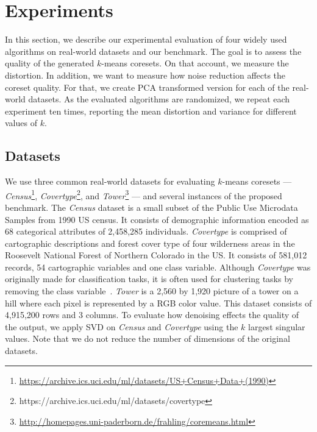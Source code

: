 \section{Experiments} \label{sec:experiments}
In this section, we describe our experimental evaluation of four widely used algorithms on real-world datasets and our benchmark. The goal is to assess the quality of the generated $k$-means coresets. On that account, we measure the distortion. In addition, we want to measure how noise reduction affects the coreset quality. For that, we create PCA transformed version for each of the real-world datasets. As the evaluated algorithms are randomized, we repeat each experiment ten times, reporting the mean distortion and variance for different values of $k$.


\subsection{Datasets}
We use three common real-world datasets for evaluating $k$-means coresets 
---
\textit{Census}\footnote{\url{https://archive.ics.uci.edu/ml/datasets/US+Census+Data+(1990)}},
\textit{Covertype}\footnote{https://archive.ics.uci.edu/ml/datasets/covertype}, and 
\textit{Tower}\footnote{\url{http://homepages.uni-paderborn.de/frahling/coremeans.html}}
---
and several instances of the proposed benchmark. 
The \textit{Census} dataset is a small subset of the Public Use Microdata Samples from 1990 US census. It consists of demographic information encoded as 68 categorical attributes of 2,458,285 individuals. \textit{Covertype} is comprised of cartographic descriptions and forest cover type of four wilderness areas in the Roosevelt National Forest of Northern Colorado in the US. It consists of 581,012 records, 54 cartographic variables and one class variable. Although \textit{Covertype} was originally made for classification tasks, it is often used for clustering tasks by removing the class variable~\cite{AckermannMRSLS12}. \textit{Tower} is a 2,560 by 1,920 picture of a tower on a hill where each pixel is represented by a RGB color value. This dataset consists of 4,915,200 rows and 3 columns. To evaluate how denoising effects the quality of the output, we apply SVD on \textit{Census} and \textit{Covertype} using the $k$ largest singular values. Note that we do not reduce the number of dimensions of the original datasets. 


